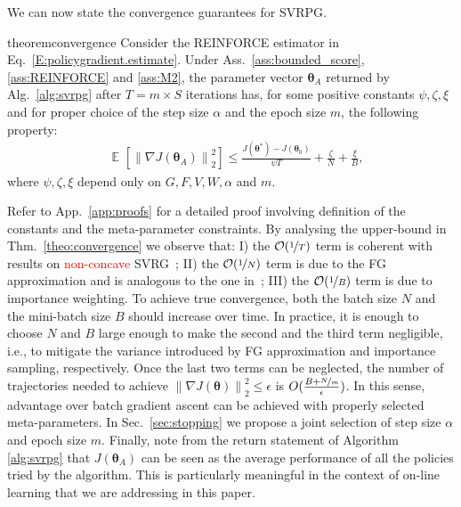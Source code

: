 \documentclass{article}
\makeatletter
\theoremstyle{remark}
\theoremstyle{definition}
\DeclareRobustCommand{\eg}{e.g.,\@\xspace}
\DeclareRobustCommand{\ie}{i.e.,\@\xspace}
\DeclareMathOperator*{\EV}{\mathbb{E}}
\newcommand{\EVV}[2][\ppvect \in \ppspace]{\EV_{#1}\left[{#2}\right]}
\newcommand{\norm}[2][\infty]{\left\|#2\right\|_{#1}}
\newcommand{\vtheta}{\boldsymbol{\theta}}
\newcommand{\gradJ}[1]{\nabla J(#1)}
\newcommand{\VARRF}{V}
\newcommand{\GRADLOG}{G}
\newcommand{\VARIS}{W}
\newcommand{\HESSLOG}{F}
\makeatother
\begin{document}
We can now state the convergence guarantees for SVRPG.
\begin{restatable}{theorem}{convergence}\label{theo:convergence}
{\color{red}Consider the REINFORCE estimator in Eq.~\ref{E:policygradient.estimate}.}
Under Ass.~\ref{ass:bounded_score}, \ref{ass:REINFORCE} and \ref{ass:M2}, the parameter vector $\vtheta_A$ returned by Alg.~\ref{alg:svrpg} after $T=m\times S$ iterations has, for some positive constants $\psi,\zeta, \xi$ and for proper choice of the step size $\alpha$ and the epoch size $m$, the following property:
\begin{align*}
	&\EVV[]
	{\norm[2]{\nabla J(\vtheta_A)}^2} 
		\leq
		\frac{J(\vtheta^*)-J(\vtheta_0)}{\psi T} +
		\frac{\zeta}{N}
		+\frac{\xi}{B},
\end{align*}
where $\psi,\zeta,\xi$ depend only on $\GRADLOG,\HESSLOG,\VARRF,\VARIS,\alpha$ and $m$.
\end{restatable}
Refer to App.~\ref{app:proofs} for a detailed proof involving definition of the constants and the meta-parameter constraints.
By analysing the upper-bound in Thm.~\ref{theo:convergence} we observe that: I) the $\mathcal{O}(\nicefrac{1}{T})$ term is coherent with results on \textcolor{red}{non-concave} SVRG~\citep[\eg][]{reddi2016stochastic}; II) the $\mathcal{O}(\nicefrac{1}{N})$ term is due to the FG approximation and is analogous to the one in~\citep{harikandeh2015stopwasting}; III) the $\mathcal{O}(\nicefrac{1}{B})$ term is due to importance weighting.
To achieve true convergence, both the batch size $N$ and the mini-batch size $B$ should increase over time. 
In practice, it is enough to choose $N$ and $B$ large enough to make the second and the third term negligible, \ie to mitigate the variance introduced by FG approximation and importance sampling, respectively.
Once the last two terms can be neglected, the number of trajectories needed to achieve $\norm[2]{\gradJ{\vtheta}}^2\leq\epsilon$ is $O(\frac{B+\nicefrac{N}{m}}{\epsilon})$. In this sense, advantage over batch gradient ascent can be achieved with properly selected meta-parameters. In Sec.~\ref{sec:stopping} we propose a joint selection of step size $\alpha$ and epoch size $m$.
Finally, note from the return statement of Algorithm \ref{alg:svrpg} that $J(\vtheta_A)$ can be seen as the average performance of all the policies tried by the algorithm. This is particularly meaningful in the context of on-line learning that we are addressing in this paper.
\end{document}
